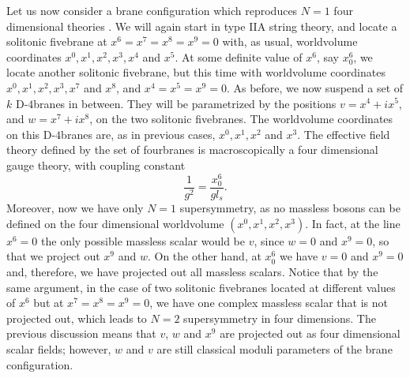 Let us now consider a brane configuration which reproduces $N=1$
four dimensional theories \cite{Wbqcd}. We will again start in type IIA string
theory, and locate a solitonic fivebrane at $x^6=x^7=x^8=x^9=0$
with, as usual, worldvolume coordinates $x^0,x^1,x^2,x^3,x^4$ and
$x^5$. At some definite value of $x^6$, say $x^6_0$, we locate
another solitonic fivebrane, but this time with worldvolume
coordinates $x^0,x^1,x^2,x^3,x^7$ and $x^8$, and $x^4=x^5=x^9=0$.
As before, we now suspend a set of $k$ D-$4$branes in between. They
will be parametrized by the positions $v=x^4+ix^5$, and
$w=x^7+ix^8$, on the two solitonic fivebranes. The worldvolume
coordinates on this D-$4$branes are, as in previous cases,
$x^0,x^1,x^2$ and $x^3$. The effective field theory defined by
the set of fourbranes is macroscopically a four dimensional gauge
theory, with coupling constant
\begin{equation}
\frac {1}{g^2} = \frac {x^6_0}{g l_s}.
\label{eq:e36}
\end{equation}
Moreover, now we have only $N=1$ supersymmetry, as no massless bosons
can be defined on the four dimensional worldvolume
$(x^0,x^1,x^2,x^3)$. In fact, at the line $x^6=0$ the only
possible massless scalar would be $v$, since $w=0$ and $x^9=0$,
so that we project out $x^9$ and $w$. On the other hand, at
$x^6_0$ we have $v=0$ and $x^9=0$ and, therefore, we have
projected out all massless scalars. Notice that by the same
argument, in the case of two solitonic fivebranes located at
different values of $x^6$ but at $x^7=x^8=x^9=0$, we have one
complex massless scalar that is not projected out, which leads to
$N=2$ supersymmetry in four dimensions. The previous discussion
means that $v$, $w$ and $x^9$ are projected out as four
dimensional scalar fields; however, $w$ and $v$ are still
classical moduli parameters of the brane configuration. 
  
